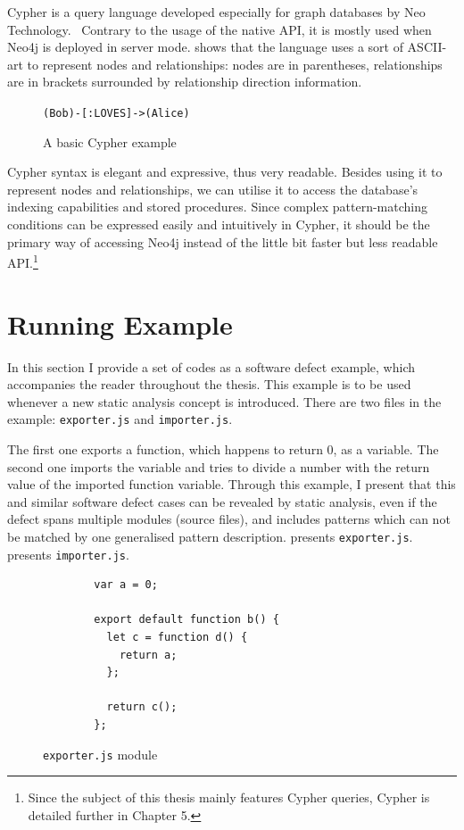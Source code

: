 Cypher is a query language developed especially for graph databases by Neo Technology.~\cite{neo4j-cypher} Contrary to the usage of the native API, it is mostly used when Neo4j is deployed in server mode.  shows that the language uses a sort of ASCII-art to represent nodes and relationships: nodes are in parentheses, relationships are in brackets surrounded by relationship direction information.

\begin{figure}[!htb]
	\centering
	\texttt{(Bob)-[:LOVES]->(Alice)}
  \caption{A basic Cypher example}
	\label{fig:cypher-intro}
\end{figure}

Cypher syntax is elegant and expressive, thus very readable. Besides using it to represent nodes and relationships, we can utilise it to access the database's indexing capabilities and stored procedures. Since complex pattern-matching conditions can be expressed easily and intuitively in Cypher, it should be the primary way of accessing Neo4j instead of the little bit faster but less readable API.\footnote{Since the subject of this thesis mainly features Cypher queries, Cypher is detailed further in Chapter 5.}


\section{Running Example}

In this section I provide a set of \es codes as a software defect example, which accompanies the reader throughout the thesis. This example is to be used whenever a new static analysis concept is introduced. There are two files in the example: \texttt{exporter.js} and \texttt{importer.js}.

The first one exports a function, which happens to return $0$, as a variable. The second one imports the variable and tries to divide a number with the return value of the imported function variable. Through this example, I present that this and similar software defect cases can be revealed by static analysis, even if the defect spans multiple \es modules (source files), and includes patterns which can not be matched by one generalised pattern description.  presents \texttt{exporter.js}.  presents \texttt{importer.js}.

\vspace{2em}
\begin{figure}[!htb]
	\centering
	\begin{minipage}{25em}
		\begin{verbatim}
		var a = 0;

		export default function b() {
		  let c = function d() {
		    return a;
		  };

		  return c();
		};
		\end{verbatim}
	\end{minipage}
  \caption{\texttt{exporter.js} module}
  \label{fig:running-example-exporter}
\end{figure}


